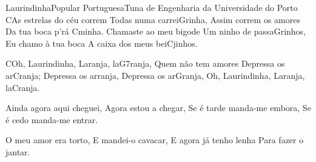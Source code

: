 \begin{musica}{Laurindinha}{Popular Portuguesa}{Tuna de Engenharia da Universidade do Porto}
\ac{C}{As} estrelas do céu correm
Todas numa carrei\ac{G}{ri}nha,
Assim correm os amores
Da tua boca p’rá \ac{C}{mi}nha.
Chamaste ao meu bigode
Um ninho de passa\ac{G}{ri}nhos,
Eu chamo à tua boca
A caixa dos meus bei\ac{C}{ji}nhos.

\ac{C}{Oh}, Laurindinha,
Laranja, la\ac{G7}{ran}ja,
Quem não tem amores
Depressa os ar\ac{C}{ran}ja;
Depressa os arranja,
Depressa os ar\ac{G}{ran}ja,
Oh, Laurindinha,
Laranja, la\ac{C}{ran}ja.

Ainda agora aqui cheguei,
Agora estou a chegar,
Se é tarde manda-me embora,
Se é cedo manda-me entrar.

O meu amor era torto,
E mandei-o cavacar,
E agora já tenho lenha
Para fazer o jantar.


\end{musica}
